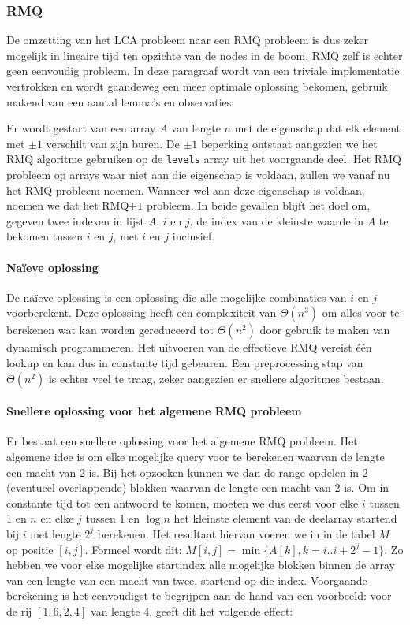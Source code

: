 \subsubsection{RMQ}
De omzetting van het LCA probleem naar een RMQ probleem is dus zeker mogelijk in
lineaire tijd ten opzichte van de nodes in de boom. RMQ zelf is echter geen
eenvoudig probleem. In deze paragraaf wordt van een triviale implementatie
vertrokken en wordt gaandeweg een meer optimale oplossing bekomen, gebruik
makend van een aantal lemma's en observaties.

Er wordt gestart van een array $A$ van lengte $n$ met de eigenschap dat elk
element met $\pm1$ verschilt van zijn buren. De $\pm1$ beperking ontstaat
aangezien we het RMQ algoritme gebruiken op de \texttt{levels} array uit het
voorgaande deel. Het RMQ probleem op arrays waar niet aan die eigenschap is
voldaan, zullen we vanaf nu het RMQ probleem noemen. Wanneer wel aan deze
eigenschap is voldaan, noemen we dat het RMQ$\pm1$ probleem. In beide gevallen
blijft het doel om, gegeven twee indexen in lijst $A$, $i$ en $j$, de index van
de kleinste waarde in $A$ te bekomen tussen $i$ en $j$, met $i$ en $j$
inclusief.

\paragraph{Naïeve oplossing}
De naïeve oplossing is een oplossing die alle mogelijke combinaties van $i$ en
$j$ voorberekent. Deze oplossing heeft een complexiteit van $\Theta(n^3)$ om
alles voor te berekenen wat kan worden gereduceerd tot $\Theta(n^2)$ door
gebruik te maken van dynamisch programmeren. Het uitvoeren van de effectieve RMQ
vereist één lookup en kan dus in constante tijd gebeuren. Een preprocessing stap
van $\Theta(n^2)$ is echter veel te traag, zeker aangezien er snellere
algoritmes bestaan.
\paragraph{Snellere oplossing voor het algemene RMQ probleem} 
Er bestaat een snellere oplossing voor het algemene RMQ probleem. Het algemene
idee is om elke mogelijke query voor te berekenen waarvan de lengte een macht
van 2 is. Bij het opzoeken kunnen we dan de range opdelen in 2 (eventueel
overlappende) blokken waarvan de lengte een macht van 2 is. Om in constante tijd
tot een antwoord te komen, moeten we dus eerst voor elke $i$ tussen 1 en $n$ en
elke $j$ tussen 1 en $\log{n}$ het kleinste element van de deelarray startend
bij $i$ met lengte $2^j$ berekenen. Het resultaat hiervan voeren we in in de
tabel $M$ op positie $[i,j]$.  Formeel wordt dit: $M[i,j] = \min{\{A[k], k = i
.. i + 2^j - 1\}}$. Zo hebben we voor elke mogelijke startindex alle mogelijke
blokken binnen de array van een lengte van een macht van twee, startend op die
index. Voorgaande berekening is het eenvoudigst te begrijpen aan de hand van een
voorbeeld: voor de rij $[1, 6, 2, 4]$  van lengte 4, geeft dit het volgende
effect:

